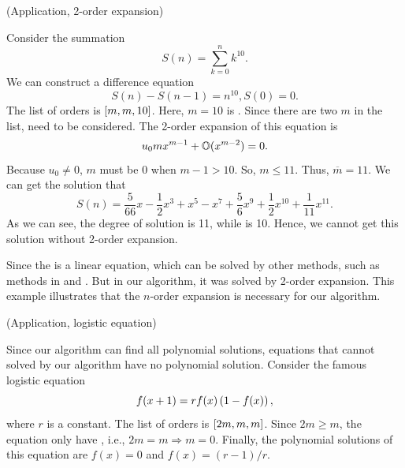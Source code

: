 \begin{example}
(Application, 2-order expansion)

Consider the summation 
\begin{equation}
    S(n)=\sum_{k=0}^n{k^{10}}.
\end{equation}
We can construct a difference equation  
\begin{equation}
    S(n)-S(n-1)=n^{10}, S(0)=0. \label{seq}
\end{equation}
The list of orders is $\left[m,m,10\right]$. Here, $m=10$ is \BPone{}. Since there are two $m$ in the list, \BPthree{} need to be considered. The 2-order expansion of this equation is 
\begin{equation}
u_0m x^{m-1}+\mathbb O(x^{m-2})=0.   
\end{equation}
Because $u_0\neq 0$, $m$ must be 0 when $m-1>10$. So, $m\le 11$. Thus, $\overline m=11$. We can get the solution that
\begin{equation}
S(n)=\frac{5}{66}x-\frac{1}{2}x^3+x^5-x^7+\frac{5}{6}x^9+\frac{1}{2}x^{10}+\frac{1}{11}x^{11}.
\end{equation}
As we can see, the degree of solution is 11, while \BPone{} is 10. Hence, we cannot get this solution without 2-order expansion. 

Since the  is a linear equation, which can be solved by other methods, such as methods in \cite{Abramov1989polynomial} and \cite{Abramov1995polynomial}. But in our algorithm, it was solved by 2-order expansion. This example illustrates that the $n$-order expansion is necessary for our algorithm. 
\end{example}

\begin{example}
(Application, logistic equation)

Since our algorithm can find all polynomial solutions, equations that cannot solved by our algorithm have no polynomial solution. Consider the famous logistic equation\citep{may1976simple}
\begin{equation}
    f(x+1)=r f(x)\left(1-f(x)\right),
\end{equation}
where $r$ is a constant. The list of orders is $\left[2m,m,m\right]$. Since $2m\ge m$, the equation only have \BPone{}, i.e., $2m=m\Rightarrow m=0$. Finally, the polynomial solutions of this equation are $f(x)=0$ and $f(x)=(r-1)/r$.
\end{example}

